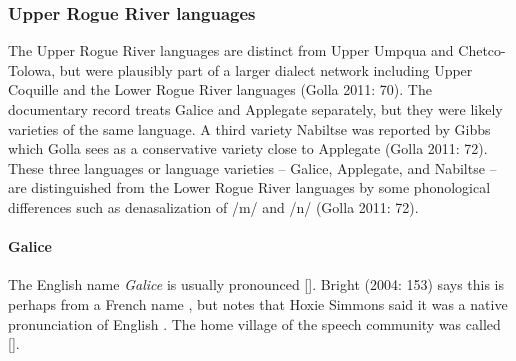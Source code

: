 \documentclass[12pt,letterpaper,oneside,article]{memoir}
\begin{document}
\subsubsection{Upper Rogue River languages}\label{sec:pacific-oregon-upperrogue}

The Upper Rogue River languages are distinct from Upper Umpqua and Chetco-Tolowa, but were plausibly part of a larger dialect network including Upper Coquille and the Lower Rogue River languages (Golla 2011: 70).
The documentary record treats Galice and Applegate separately, but they were likely varieties of the same language.
A third variety Nabiltse was reported by Gibbs which Golla sees as a conservative variety close to Applegate (Golla 2011: 72).
These three languages or language varieties – Galice, Applegate, and Nabiltse – are distinguished from the Lower Rogue River languages by some phonological differences such as denasalization of /m/ and /n/ (Golla 2011: 72). 

\paragraph{Galice}\label{sec:galice}

The English name \textit{Galice} is usually pronounced [].
Bright (2004: 153) says this is perhaps from a French name , but notes that Hoxie Simmons said it was a native pronunciation of English .
The home village of the speech community was called  [].
\end{document}
